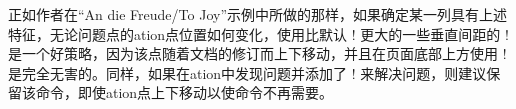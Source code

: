 \begin{description}
\begin{itemize}
正如作者在“An die Freude/To Joy”示例中所做的那样，如果确定某一列具有上述特征，无论问题点的\sync{}ation点位置如何变化，使用比默认
\!\baselineskip! 更大的一些垂直间距的 \!\ensurevspace! 是一个好策略，因为该点随着文档的修订而上下移动，并且在页面底部上方使用
\!\ensurevspace! 是完全无害的。同样，如果在\sync{}ation中发现问题并添加了 \!\ensurevspace! 来解决问题，则建议保留该命令，即使\sync{}ation点上下移动以使命令不再需要。

\end{itemize}
\end{description}

